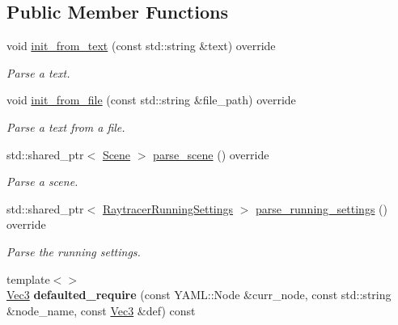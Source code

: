 \subsection*{Public Member Functions}
\begin{DoxyCompactItemize}
\item 
void \mbox{\hyperlink{classomg_1_1_y_a_m_l_parser_a625f697e850b8d027095d74f7fe65acc}{init\+\_\+from\+\_\+text}} (const std\+::string \&text) override
\begin{DoxyCompactList}\small\item\em Parse a text. \end{DoxyCompactList}\item 
void \mbox{\hyperlink{classomg_1_1_y_a_m_l_parser_a88af0bc72d0f4ce3e9e489e0b6037a53}{init\+\_\+from\+\_\+file}} (const std\+::string \&file\+\_\+path) override
\begin{DoxyCompactList}\small\item\em Parse a text from a file. \end{DoxyCompactList}\item 
\mbox{\label{classomg_1_1_y_a_m_l_parser_a53b9aa0f7e9e43c0f40ae494a2f290d2}} 
std\+::shared\+\_\+ptr$<$ \mbox{\hyperlink{classomg_1_1_scene}{Scene}} $>$ \mbox{\hyperlink{classomg_1_1_y_a_m_l_parser_a53b9aa0f7e9e43c0f40ae494a2f290d2}{parse\+\_\+scene}} () override
\begin{DoxyCompactList}\small\item\em Parse a scene. \end{DoxyCompactList}\item 
\mbox{\label{classomg_1_1_y_a_m_l_parser_aeb42aa4859c252619e26f165b9a77efd}} 
std\+::shared\+\_\+ptr$<$ \mbox{\hyperlink{structomg_1_1_raytracer_running_settings}{Raytracer\+Running\+Settings}} $>$ \mbox{\hyperlink{classomg_1_1_y_a_m_l_parser_aeb42aa4859c252619e26f165b9a77efd}{parse\+\_\+running\+\_\+settings}} () override
\begin{DoxyCompactList}\small\item\em Parse the running settings. \end{DoxyCompactList}\item 
\mbox{\label{classomg_1_1_y_a_m_l_parser_a0fd1ccd8900aad880d1f32f73d5bf56a}} 
{\footnotesize template$<$$>$ }\\\mbox{\hyperlink{namespaceomg_a45a9482677fee9933ff369b49894e316}{Vec3}} {\bfseries defaulted\+\_\+require} (const Y\+A\+M\+L\+::\+Node \&curr\+\_\+node, const std\+::string \&node\+\_\+name, const \mbox{\hyperlink{namespaceomg_a45a9482677fee9933ff369b49894e316}{Vec3}} \&def) const

\end{DoxyCompactItemize}
